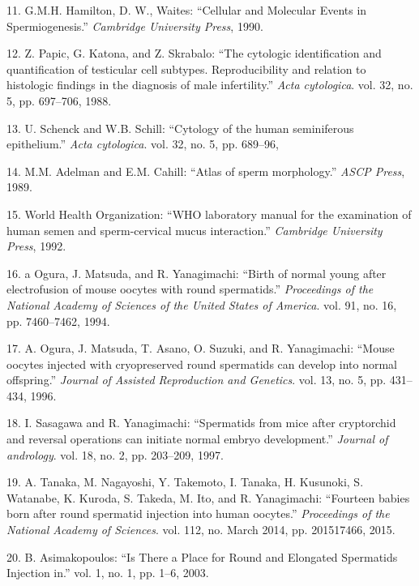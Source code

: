 \documentclass[12pt,twoside]{reedthesis}
\theoremstyle{definition}
\theoremstyle{definition}
\theoremstyle{remark}
\begin{document}
  \hypertarget{ref-Hamilton1987}{}
  11. G.M.H. Hamilton, D. W., Waites: ``Cellular and Molecular Events in
  Spermiogenesis.'' \emph{Cambridge University Press}, 1990.
  
  \hypertarget{ref-Papic}{}
  12. Z. Papic, G. Katona, and Z. Skrabalo: ``The cytologic identification
  and quantification of testicular cell subtypes. Reproducibility and
  relation to histologic findings in the diagnosis of male infertility.''
  \emph{Acta cytologica}. vol. 32, no. 5, pp. 697--706, 1988.
  
  \hypertarget{ref-Schenck}{}
  13. U. Schenck and W.B. Schill: ``Cytology of the human seminiferous
  epithelium.'' \emph{Acta cytologica}. vol. 32, no. 5, pp. 689--96,
  
  \hypertarget{ref-Adelman1989}{}
  14. M.M. Adelman and E.M. Cahill: ``Atlas of sperm morphology.''
  \emph{ASCP Press}, 1989.
  
  \hypertarget{ref-WorldHealthOrganization1992}{}
  15. World Health Organization: ``WHO laboratory manual for the
  examination of human semen and sperm-cervical mucus interaction.''
  \emph{Cambridge University Press}, 1992.
  
  \hypertarget{ref-Ogura1994}{}
  16. a Ogura, J. Matsuda, and R. Yanagimachi: ``Birth of normal young
  after electrofusion of mouse oocytes with round spermatids.''
  \emph{Proceedings of the National Academy of Sciences of the United
  States of America}. vol. 91, no. 16, pp. 7460--7462, 1994.
  
  \hypertarget{ref-Kimura1995}{}
  17. A. Ogura, J. Matsuda, T. Asano, O. Suzuki, and R. Yanagimachi:
  ``Mouse oocytes injected with cryopreserved round spermatids can develop
  into normal offspring.'' \emph{Journal of Assisted Reproduction and
  Genetics}. vol. 13, no. 5, pp. 431--434, 1996.
  
  \hypertarget{ref-Sasagawa}{}
  18. I. Sasagawa and R. Yanagimachi: ``Spermatids from mice after
  cryptorchid and reversal operations can initiate normal embryo
  development.'' \emph{Journal of andrology}. vol. 18, no. 2, pp.
  203--209, 1997.
  
  \hypertarget{ref-Tanaka2015}{}
  19. A. Tanaka, M. Nagayoshi, Y. Takemoto, I. Tanaka, H. Kusunoki, S.
  Watanabe, K. Kuroda, S. Takeda, M. Ito, and R. Yanagimachi: ``Fourteen
  babies born after round spermatid injection into human oocytes.''
  \emph{Proceedings of the National Academy of Sciences}. vol. 112, no.
  March 2014, pp. 201517466, 2015.
  
  \hypertarget{ref-Asimakopoulos2003}{}
  20. B. Asimakopoulos: ``Is There a Place for Round and Elongated
  Spermatids Injection in.'' vol. 1, no. 1, pp. 1--6, 2003.
  
\end{document}
